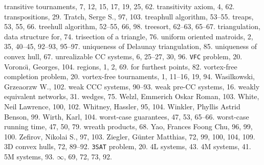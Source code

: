 transitive tournaments, 7, 12, 15, 17, 19, 25, 62.
transitivity axiom, 4, 62.
transpositions, 29.
Tratch, Serge S., 97, 103.
treaphull algorithm, 53--55.
treaps, 53, 55, 66.
treehull algorithm, 52--55, 66, 98.
treesort, 62--63, 65--67.
triangulation, data structure for, 74.
trisection of a triangle, 76.
\medskip
uniform oriented matroids, 2, 35, 40--45, 92--93, 95--97.
uniqueness of Delaunay triangulation, 85.
uniqueness of convex hull, 67.
unrealizable CC systems, 6, 25--27, 30, 96.
\medskip
{\tt VFC} problem, 20.
Vorono\"\i, Georges, 104.
\sub regions, 1, 2, 69.
\subsub for furthest points, 82.
vortex-free completion problem, 20.
vortex-free tournaments, 1, 11--16, 19, 94.
\medskip
Wasilkowski, Grzeaorzw W., 102.
weak CCC systems, 90--93.
weak pre-CC systems, 16.
weakly equivalent networks, 31.
wedges, 75.
Welzl, Emmerich Oskar Roman, 103.
White, Neil Lawrence, 100, 102.
Whitney, Hassler, 95, 104.
Winkler, Phyllis Astrid Benson, 99.
Wirth, Karl, 104.
worst-case guarantees, 47, 53, 65--66.
worst-case running time, 47, 50, 79.
wreath products, 68.
\medskip
Yao, Frances Foong Chu, 96, 99, 100.
\medskip
Zefirov, Nikolai S., 97, 103.
Ziegler, G\"unter Matthias, 72, 99, 100, 104, 109.
\medskip
3D convex hulls, 72, 89--92.
{\tt 3SAT} problem, 20.
\medskip
4L systems, 43.
4M systems, 41.
\medskip
5M systems, 93.
\medskip
$\infty$, 69, 72, 73, 92.

\bye
